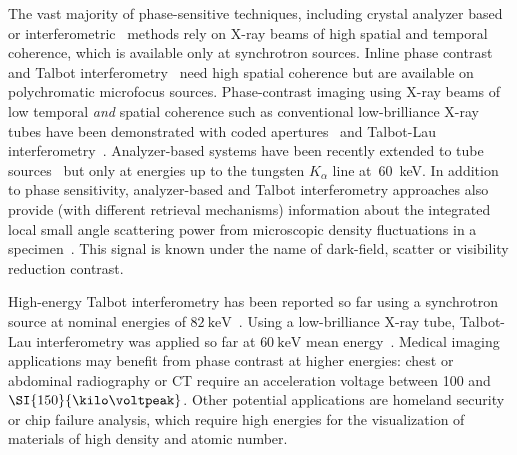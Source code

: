 \documentclass{pnastwo}
\begin{document}
\begin{article}
The vast majority of phase-sensitive techniques, including crystal analyzer
based~\cite{Davis1995,Chapman1997} or interferometric~\cite{Bonse1965,Momose1996}
methods rely on X-ray beams of high spatial and temporal coherence, which is
available only at synchrotron sources. Inline
phase contrast~\cite{Snigirev1995,Wilkins1996,Cloetens1996} and
Talbot interferometry~\cite{Cloetens1997,David2002,Momose2003a} need high
spatial coherence but are available on polychromatic microfocus sources.
Phase-contrast imaging using X-ray beams of low temporal \emph{and}
spatial coherence such as conventional low-brilliance X-ray tubes have been
demonstrated with coded
apertures~\cite{Munro2012} and Talbot-Lau
interferometry~\cite{Pfeiffer2006}. Analyzer-based systems have been
recently extended to tube sources~\cite{Nesch2009,Parham2009}
but only at energies up
to the tungsten $K_\alpha$ line at~\SI{60}{\kilo\eV}.
In addition to phase sensitivity, analyzer-based and Talbot interferometry 
approaches also provide (with different retrieval mechanisms)
information about the integrated local small angle scattering power from
microscopic density fluctuations in a specimen~\cite{Pfeiffer2008}. This signal is known under the name of dark-field, scatter or visibility reduction contrast.

High-energy Talbot interferometry has been reported so far using a
synchrotron source at nominal energies of
$\SI{82}{\kilo\electronvolt}$~\cite{Willner2013}.
Using a low-brilliance X-ray tube, Talbot-Lau interferometry was
applied so far at $\SI{60}{\kilo\electronvolt}$ mean energy~\cite{Donath2009}.
Medical imaging applications may benefit from phase contrast at higher
energies: chest or abdominal
radiography or CT require an acceleration voltage between \num{100} and
$\SI{150}{\kilo\voltpeak}$. Other potential applications are homeland
security or chip failure analysis, which require high energies for the
visualization of materials of high density and atomic number.


\end{article}
\end{document}
